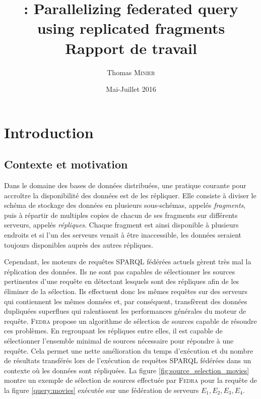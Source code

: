 \documentclass[a4paper]{article}
\title{\peneloop : Parallelizing federated \sparql query using replicated fragments\\Rapport de travail}
\author{Thomas \textsc{Minier}}
\date{Mai-Juillet 2016}
\def\sparql{\textsc{SPARQL}\xspace}
\def\fedra{\textsc{Fedra}\xspace}
\begin{document}
\maketitle

\tableofcontents

\newpage

\section{Introduction}

\subsection{Contexte et motivation}

Dans le domaine des bases de données distribuées, une pratique courante pour accroître la disponibilité des données est de les répliquer. Elle consiste à diviser le schéma de stockage des données en plusieurs sous-schémas, appelés \textit{fragments}, puis à répartir de multiples copies de chacun de ses fragments sur différents serveurs, appelés \textit{répliques}. Chaque fragment est ainsi disponible à plusieurs endroits et si l'un des serveurs venait à être inaccessible, les données seraient toujours disponibles auprès des autres répliques.

Cependant, les moteurs de requêtes \sparql fédérées actuels \cite{schwarte2011fedx,acosta2011anapsid} gèrent très mal la réplication des données. Ils ne sont pas capables de sélectionner les sources pertinentes d'une requête en détectant lesquels sont des répliques afin de les éliminer de la sélection. Ils effectuent donc les mêmes requêtes sur des serveurs qui contiennent les mêmes données et, par conséquent, transfèrent des données dupliquées superflues qui ralentissent les performances générales du moteur de requête. \fedra \cite{montoya2014fedra} propose un algorithme de sélection de sources capable de résoudre ces problèmes. En regroupant les répliques entre elles, il est capable de sélectionner l'ensemble minimal de sources nécessaire pour répondre à une requête. Cela permet une nette amélioration du temps d'exécution et du nombre de résultats transférés lors de l'exécution de requêtes \sparql fédérées dans un contexte où les données sont répliquées. La figure \ref{fig:source_selection_movies} montre un exemple de sélection de sources effectuée par \fedra pour la requête de la figure \ref{query:movies} exécutée sur une fédération de serveurs $E_1, E_2, E_3, E_4$.
\end{document}
